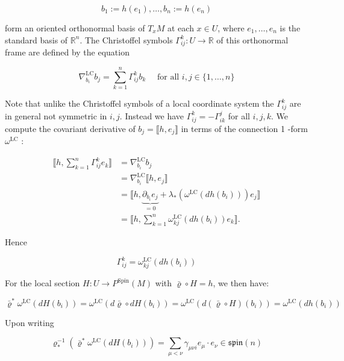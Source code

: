 \documentclass[10pt, letterpaper]{article}
\begin{document}
$$
b_{1}:=h\left(e_{1}\right), \ldots, b_{n}:=h\left(e_{n}\right)
$$

form an oriented orthonormal basis of $T_{x} M$ at each $x \in U$, where $e_{1}, \ldots, e_{n}$ is the standard basis of $\mathbb{R}^{n}$. The Christoffel symbols $\Gamma_{i j}^{k}: U \rightarrow \mathbb{R}$ of this orthonormal frame are defined by the equation

$$
\nabla_{b_{i}}^{\mathrm{LC}} b_{j}=\sum_{k=1}^{n} \Gamma_{i j}^{k} b_{k} \quad \text { for all } i, j \in\{1, \ldots, n\}
$$

Note that unlike the Christoffel symbols of a local coordinate system the $\Gamma_{i j}^{k}$ are in general not symmetric in $i, j$. Instead we have $\Gamma_{i j}^{k}=-\Gamma_{i k}^{j}$ for all $i, j, k$. We compute the covariant derivative of $b_{j}=\llbracket h, e_{j} \rrbracket$ in terms of the connection 1 -form $\omega^{\mathrm{LC}}$ :

$$
\begin{aligned}
\llbracket h, \sum_{k=1}^{n} \Gamma_{i j}^{k} e_{k} \rrbracket & =\nabla_{b_{i}}^{\mathrm{LC}} b_{j} \\
& =\nabla_{b_{i}}^{\mathrm{LC}} \llbracket h, e_{j} \rrbracket \\
& =\llbracket h, \underbrace{\partial_{b_{i}} e_{j}}_{=0}+\lambda_{*}\left(\omega^{\mathrm{LC}}\left(d h\left(b_{i}\right)\right)\right) e_{j} \rrbracket \\
& =\llbracket h, \sum_{k=1}^{n} \omega_{k j}^{\mathrm{LC}}\left(d h\left(b_{i}\right)\right) e_{k} \rrbracket .
\end{aligned}
$$

Hence

$$
\Gamma_{i j}^{k}=\omega_{k j}^{\mathrm{LC}}\left(d h\left(b_{i}\right)\right)
$$

For the local section $H: U \rightarrow P^{\operatorname{Spin}}(M)$ with $\bar{\varrho} \circ H=h$, we then have:

$$
\bar{\varrho}^{*} \omega^{\mathrm{LC}}\left(d H\left(b_{i}\right)\right)=\omega^{\mathrm{LC}}\left(d \bar{\varrho} \circ d H\left(b_{i}\right)\right)=\omega^{\mathrm{LC}}\left(d(\bar{\varrho} \circ H)\left(b_{i}\right)\right)=\omega^{\mathrm{LC}}\left(d h\left(b_{i}\right)\right)
$$

Upon writing

$$
\varrho_{*}^{-1}\left(\bar{\varrho}^{*} \omega^{\mathrm{LC}}\left(d H\left(b_{i}\right)\right)\right)=\sum_{\mu<\nu} \gamma_{\mu \nu i} e_{\mu} \cdot e_{\nu} \in \mathfrak{s p i n}(n)
$$
\end{document}
